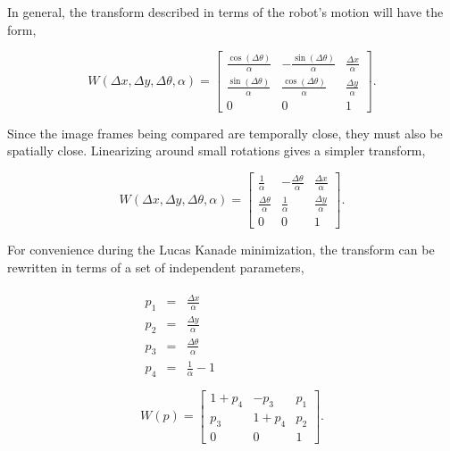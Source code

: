 \documentclass[letterpaper, 10 pt, conference]{ieeeconf}
\newcommand{\comment}[1]{} %
\begin{document}
In general, the transform described in terms of the robot's motion will have the form,

\comment{Is this correct? Should the $\alpha$ be inside the sinusoids?}

\begin{equation*}
W(\Delta x, \Delta y, \Delta \theta, \alpha) = \begin{bmatrix} \frac{\cos(\Delta \theta)}{\alpha} & -\frac{\sin(\Delta \theta)}{\alpha} & \frac{\Delta x}{\alpha} \\ \frac{\sin(\Delta \theta)}{\alpha} & \frac{\cos(\Delta \theta)}{\alpha} & \frac{\Delta y}{\alpha} \\ 0 & 0 & 1 \end{bmatrix}.
\end{equation*}

Since the image frames being compared are temporally close, they must also be spatially close. Linearizing around small rotations gives a simpler transform,

\begin{equation*}
W(\Delta x, \Delta y, \Delta \theta, \alpha) = \begin{bmatrix} \frac{1}{\alpha} & -\frac{\Delta \theta}{\alpha} & \frac{\Delta x}{\alpha} \\ \frac{\Delta \theta}{\alpha} & \frac{1}{\alpha} & \frac{\Delta y}{\alpha} \\ 0 & 0 & 1 \end{bmatrix}.
\end{equation*}

For convenience during the Lucas Kanade minimization, the transform can be rewritten in terms of a set of independent parameters,

\begin{eqnarray}
\begin{split} \label{eq:warp_param_conversion}
p_1 &=& \frac{\Delta x}{\alpha}\\
p_2 &=& \frac{\Delta y}{\alpha}\\
p_3 &=& \frac{\Delta \theta}{\alpha}\\
p_4 &=& \frac{1}{\alpha} - 1\\
\end{split}
\\ \label{eq:param_warp}
W(p) = \begin{bmatrix} 1+p_4 & -p_3 & p_1 \\ p_3 & 1+p_4 & p_2 \\ 0 & 0 & 1 \end{bmatrix}.
\end{eqnarray}
\end{document}
